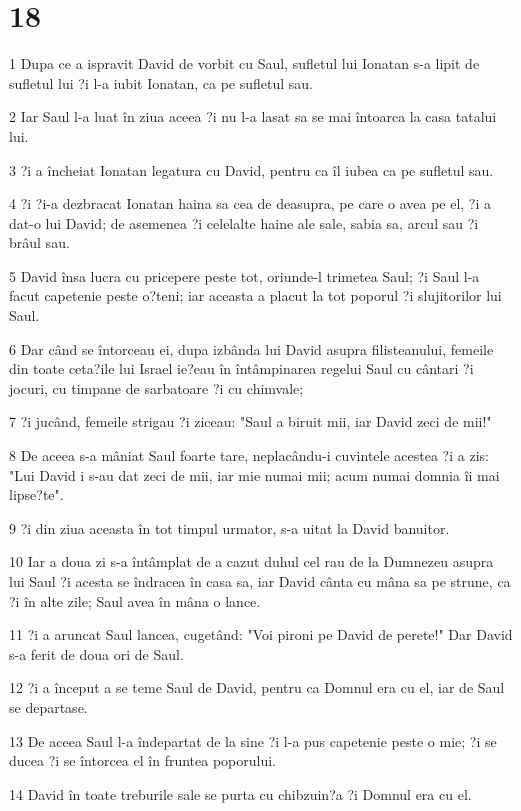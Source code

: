 \chapter{18}

\par 1 Dupa ce a ispravit David de vorbit cu Saul, sufletul lui Ionatan s-a lipit de sufletul lui ?i l-a iubit Ionatan, ca pe sufletul sau.
\par 2 Iar Saul l-a luat în ziua aceea ?i nu l-a lasat sa se mai întoarca la casa tatalui lui.
\par 3 ?i a încheiat Ionatan legatura cu David, pentru ca îl iubea ca pe sufletul sau.
\par 4 ?i ?i-a dezbracat Ionatan haina sa cea de deasupra, pe care o avea pe el, ?i a dat-o lui David; de asemenea ?i celelalte haine ale sale, sabia sa, arcul sau ?i brâul sau.
\par 5 David însa lucra cu pricepere peste tot, oriunde-l trimetea Saul; ?i Saul l-a facut capetenie peste o?teni; iar aceasta a placut la tot poporul ?i slujitorilor lui Saul.
\par 6 Dar când se întorceau ei, dupa izbânda lui David asupra filisteanului, femeile din toate ceta?ile lui Israel ie?eau în întâmpinarea regelui Saul cu cântari ?i jocuri, cu timpane de sarbatoare ?i cu chimvale;
\par 7 ?i jucând, femeile strigau ?i ziceau: "Saul a biruit mii, iar David zeci de mii!"
\par 8 De aceea s-a mâniat Saul foarte tare, neplacându-i cuvintele acestea ?i a zis: "Lui David i s-au dat zeci de mii, iar mie numai mii; acum numai domnia îi mai lipse?te".
\par 9 ?i din ziua aceasta în tot timpul urmator, s-a uitat la David banuitor.
\par 10 Iar a doua zi s-a întâmplat de a cazut duhul cel rau de la Dumnezeu asupra lui Saul ?i acesta se îndracea în casa sa, iar David cânta cu mâna sa pe strune, ca ?i în alte zile; Saul avea în mâna o lance.
\par 11 ?i a aruncat Saul lancea, cugetând: "Voi pironi pe David de perete!" Dar David s-a ferit de doua ori de Saul.
\par 12 ?i a început a se teme Saul de David, pentru ca Domnul era cu el, iar de Saul se departase.
\par 13 De aceea Saul l-a îndepartat de la sine ?i l-a pus capetenie peste o mie; ?i se ducea ?i se întorcea el în fruntea poporului.
\par 14 David în toate treburile sale se purta cu chibzuin?a ?i Domnul era cu el.
